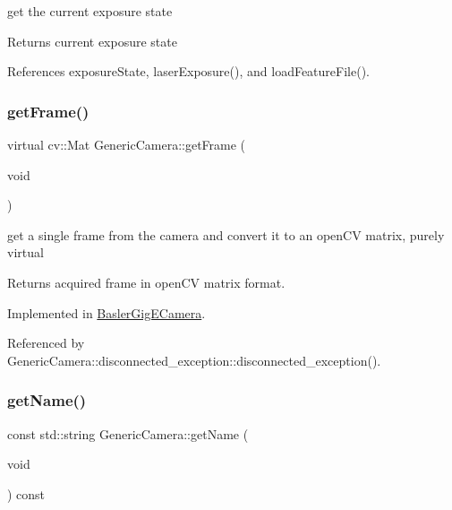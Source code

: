 get the current exposure state \begin{DoxyReturn}{Returns}
current exposure state 
\end{DoxyReturn}


References exposure\+State, laser\+Exposure(), and load\+Feature\+File().

\mbox{\label{classGenericCamera_abeaa74ba34179da70ec2c4bbb9b0d793}} 
\subsubsection{\texorpdfstring{get\+Frame()}{getFrame()}}
{\footnotesize\ttfamily virtual cv\+::\+Mat Generic\+Camera\+::get\+Frame (\begin{DoxyParamCaption}\item[{void}]{ }\end{DoxyParamCaption})\hspace{0.3cm}{\ttfamily [pure virtual]}}

get a single frame from the camera and convert it to an open\+CV matrix, purely virtual \begin{DoxyReturn}{Returns}
acquired frame in open\+CV matrix format. 
\end{DoxyReturn}


Implemented in \hyperlink{classBaslerGigECamera_a8e2789aa27a9b0a8075457223afa415e}{Basler\+Gig\+E\+Camera}.



Referenced by Generic\+Camera\+::disconnected\+\_\+exception\+::disconnected\+\_\+exception().

\mbox{\label{classGenericCamera_a7f97060cc4089fb4d8834ce8c055a561}} 
\subsubsection{\texorpdfstring{get\+Name()}{getName()}}
{\footnotesize\ttfamily const std\+::string Generic\+Camera\+::get\+Name (\begin{DoxyParamCaption}\item[{void}]{ }\end{DoxyParamCaption}) const\hspace{0.3cm}{\ttfamily [inline]}}

